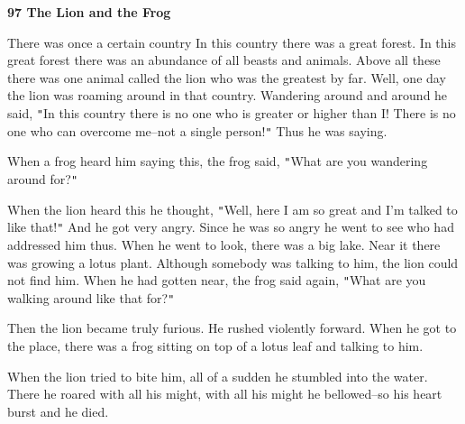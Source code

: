 
\textbf{97 The Lion and the Frog}

There was once a certain country In this country there was a great forest. In this
great forest there was an abundance of all beasts and animals. Above all these
there was one animal called the lion who was the greatest by far. Well, one day
the lion was roaming around in that country. Wandering around and around he said,
\texttt{"}In this country there is no one who is greater or higher than I! There
is no one who can overcome me--not a single person!\texttt{"} Thus he was saying.

When a frog heard him saying this, the frog said, \texttt{"}What are you wandering
around for?\texttt{"}

When the lion heard this he thought, \texttt{"}Well, here I am so great and I'm
talked to like that!\texttt{"} And he got very angry. Since he was so angry he
went to see who had addressed him thus. When he went to look, there was a big lake.
Near it there was growing a lotus plant. Although somebody was talking to him,
the lion could not find him. When he had gotten near, the frog said again, \texttt{"}What
are you walking around like that for?\texttt{"}

Then the lion became truly furious. He rushed violently forward. When he got to
the place, there was a frog sitting on top of a lotus leaf and talking to him.

When the lion tried to bite him, all of a sudden he stumbled into the water. There
he roared with all his might, with all his might he bellowed--so his heart burst
and he died.


